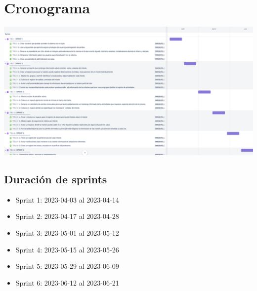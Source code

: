 \documentclass{article}
\begin{document}
\section{Cronograma}
	\begin{landscape}
		\centering
		\hspace{-1.5cm}
		\includegraphics[scale=0.40]{Jira2.png}
	\end{landscape}
	
	\newpage
	\subsection{Duración de sprints}
	\begin{itemize}
		\item Sprint 1: 2023-04-03 al 2023-04-14
		\item Sprint 2: 2023-04-17 al 2023-04-28
		\item Sprint 3: 2023-05-01 al 2023-05-12
		\item Sprint 4: 2023-05-15 al 2023-05-26
		\item Sprint 5: 2023-05-29 al 2023-06-09
		\item Sprint 6: 2023-06-12 al 2023-06-21
	\end{itemize}	
\end{document}
